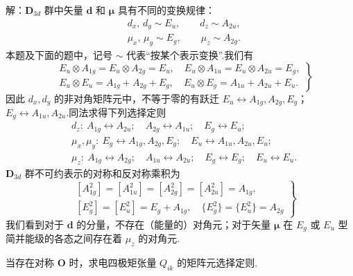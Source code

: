 \begin{xiti}
解：$\boldsymbol{D}_{3d}$ 群中矢量 $\boldsymbol{d}$ 和 $\boldsymbol{\mu}$ 具有不同的变换规律：
\begin{equation*}
\begin{aligned}
  &d_x,\,d_y\sim E_u,\qquad d_z\sim A_{2u},\\
  &\mu_x,\,\mu_y\sim E_g,\qquad \mu_z\sim A_{2g}.
\end{aligned}
\end{equation*}
本题及下面的题中，记号 $\sim$ 代表“按某个表示变换”.我们有
\begin{equation}
\left.\begin{aligned}
  &E_u\otimes A_{1g}=E_u\otimes A_{2g}=E_u,\quad
   E_u\otimes A_{1u}=E_u\otimes A_{2u}=E_g,\\
  &E_u\otimes E_u=A_{1g}+A_{2g}+E_g,\quad
   E_u\otimes E_g=A_{1u}+A_{2u}+E_u.
\end{aligned}\right\}
\end{equation}
因此 $d_x,d_y$ 的非对角矩阵元中，不等于零的有跃迁
$E_u\leftrightarrow A_{1g},A_{2g},E_g$；$E_g\leftrightarrow A_{1u},A_{2u}$.同法求得下列选择定则
\begin{equation*}
\begin{aligned}
  &d_z:\ A_{1g}\leftrightarrow A_{2u};\quad
   A_{2g}\leftrightarrow A_{1u};\quad E_g\leftrightarrow E_u;\\
  &\mu_x,\mu_y:\ E_g\leftrightarrow A_{1g},A_{2g},E_g;\quad
   E_u\leftrightarrow A_{1u},A_{2u},E_u;\\
  &\mu_z:\ A_{1g}\leftrightarrow A_{2g};\quad
   A_{1u}\leftrightarrow A_{2u};\quad
   E_g\leftrightarrow E_g;\quad E_u\leftrightarrow E_u.
\end{aligned}
\end{equation*}
$\boldsymbol{D}_{3d}$ 群不可约表示的对称和反对称乘积为
\begin{equation}
\left.\begin{aligned}
  &[A_{1g}^2]=[A_{1u}^2]=[A_{2g}^2]=[A_{2u}^2]=A_{1g},\\
  &[E_g^2]=[E_u^2]=E_g+A_{1g},\quad
   \{E_g^2\}=\{E_u^2\}=A_{2g}
\end{aligned}\right\}
\end{equation}
我们看到对于 $\boldsymbol{d}$ 的分量，不存在（能量的）对角元；对于矢量 $\boldsymbol{\mu}$ 在 $E_g$ 或 $E_u$ 型简并能级的各态之间存在着 $\mu_z$ 的对角元.

\quad 当存在对称 $\boldsymbol{O}$ 时，求电四极矩张量 $Q_{ik}$ 的矩阵元选择定则.


\end{xiti}
